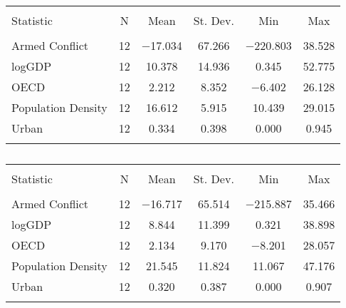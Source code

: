 \begin{table}[!htbp] \centering 
  \caption{} 
  \label{} 
\begin{tabular}{@{\extracolsep{5pt}}lccccc} 
\\[-1.8ex]\hline 
\hline \\[-1.8ex] 
Statistic & \multicolumn{1}{c}{N} & \multicolumn{1}{c}{Mean} & \multicolumn{1}{c}{St. Dev.} & \multicolumn{1}{c}{Min} & \multicolumn{1}{c}{Max} \\ 
\hline \\[-1.8ex] 
Armed Conflict & 12 & $-$17.034 & 67.266 & $-$220.803 & 38.528 \\ 
logGDP & 12 & 10.378 & 14.936 & 0.345 & 52.775 \\ 
OECD & 12 & 2.212 & 8.352 & $-$6.402 & 26.128 \\ 
Population Density & 12 & 16.612 & 5.915 & 10.439 & 29.015 \\ 
Urban & 12 & 0.334 & 0.398 & 0.000 & 0.945 \\ 
\hline \\[-1.8ex] 
\end{tabular} 
\end{table} 

\begin{table}[!htbp] \centering 
  \caption{} 
  \label{} 
\begin{tabular}{@{\extracolsep{5pt}}lccccc} 
\\[-1.8ex]\hline 
\hline \\[-1.8ex] 
Statistic & \multicolumn{1}{c}{N} & \multicolumn{1}{c}{Mean} & \multicolumn{1}{c}{St. Dev.} & \multicolumn{1}{c}{Min} & \multicolumn{1}{c}{Max} \\ 
\hline \\[-1.8ex] 
Armed Conflict & 12 & $-$16.717 & 65.514 & $-$215.887 & 35.466 \\ 
logGDP & 12 & 8.844 & 11.399 & 0.321 & 38.898 \\ 
OECD & 12 & 2.134 & 9.170 & $-$8.201 & 28.057 \\ 
Population Density & 12 & 21.545 & 11.824 & 11.067 & 47.176 \\ 
Urban & 12 & 0.320 & 0.387 & 0.000 & 0.907 \\ 
\hline \\[-1.8ex] 
\end{tabular} 
\end{table} 

